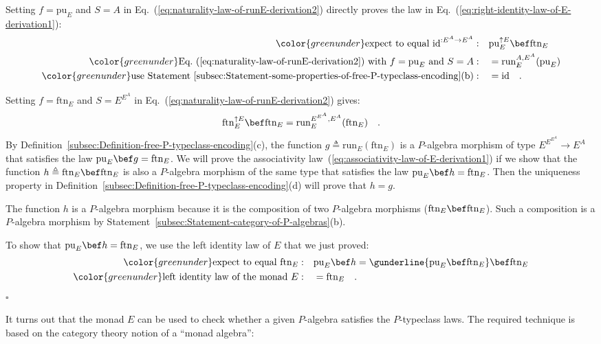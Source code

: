 Setting $f=\text{pu}_{E}$ and $S=A$ in Eq.~(\ref{eq:naturality-law-of-runE-derivation2})
directly proves the law in Eq.~(\ref{eq:right-identity-law-of-E-derivation1}):
\begin{align*}
{\color{greenunder}\text{expect to equal }\text{id}^{:E^{A}\rightarrow E^{A}}:}\quad & \text{pu}_{E}^{\uparrow E}\bef\text{ftn}_{E}\\
{\color{greenunder}\text{Eq.~(\ref{eq:naturality-law-of-runE-derivation2}) with }f=\text{pu}_{E}\text{ and }S=A:}\quad & =\text{run}_{E}^{A,E^{A}}(\text{pu}_{E})\\
{\color{greenunder}\text{use Statement~\ref{subsec:Statement-some-properties-of-free-P-typeclass-encoding}(b)}:}\quad & =\text{id}\quad.
\end{align*}

Setting $f=\text{ftn}_{E}$ and $S=E^{E^{A}}$ in Eq.~(\ref{eq:naturality-law-of-runE-derivation2})
gives:
\[
\text{ftn}_{E}^{\uparrow E}\bef\text{ftn}_{E}=\text{run}_{E}^{E^{E^{A}},E^{A}}(\text{ftn}_{E})\quad.
\]
By Definition~\ref{subsec:Definition-free-P-typeclass-encoding}(c),
the function $g\triangleq\text{run}_{E}(\text{ftn}_{E})$ is a $P$-algebra
morphism of type $E^{E^{E^{A}}}\rightarrow E^{A}$ that satisfies
the law $\text{pu}_{E}\bef g=\text{ftn}_{E}$. We will prove the associativity
law~(\ref{eq:associativity-law-of-E-derivation1}) if we show that
the function $h\triangleq\text{ftn}_{E}\bef\text{ftn}_{E}$ is also
a $P$-algebra morphism of the same type that satisfies the law $\text{pu}_{E}\bef h=\text{ftn}_{E}$.
Then the uniqueness property in Definition~\ref{subsec:Definition-free-P-typeclass-encoding}(d)
will prove that $h=g$. 

The function $h$ is a $P$-algebra morphism because it is the composition
of two $P$-algebra morphisms ($\text{ftn}_{E}\bef\text{ftn}_{E}$).
Such a composition is a $P$-algebra morphism by Statement~\ref{subsec:Statement-category-of-P-algebras}(b).

To show that $\text{pu}_{E}\bef h=\text{ftn}_{E}$, we use the left
identity law of $E$ that we just proved:
\begin{align*}
{\color{greenunder}\text{expect to equal }\text{ftn}_{E}:}\quad & \text{pu}_{E}\bef h=\gunderline{\text{pu}_{E}\bef\text{ftn}_{E}}\bef\text{ftn}_{E}\\
{\color{greenunder}\text{left identity law of the monad }E:}\quad & =\text{ftn}_{E}\quad.
\end{align*}
$\square$

It turns out that the monad $E$ can be used to check whether a given
$P$-algebra satisfies the $P$-typeclass laws. The required technique
is based on the category theory notion of a \textsf{``}monad
algebra\textsf{''}:

